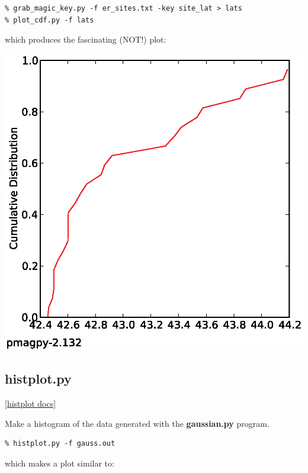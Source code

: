 \documentclass[11pt]{book}
\begin{document}
{{{\begin{verbatim}
% grab_magic_key.py -f er_sites.txt -key site_lat > lats 
% plot_cdf.py -f lats
\end{verbatim}

which produces  the fascinating (NOT!) plot:

\includegraphics[width=15cm]{EPSfiles/grab_magic_key.eps}


\subsection{histplot.py}
\href{http://earthref.org/PmagPy/pmagpydocs/histplot-module.html}{[histplot docs]}

Make a histogram of the data generated with the {\bf gaussian.py} program.



\begin{verbatim}
% histplot.py -f gauss.out
\end{verbatim}

\noindent  which makes a plot similar to:

}}}
\end{document}
